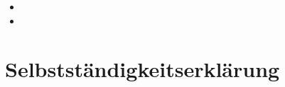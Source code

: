 \documentclass[ngerman, 12pt]{article} %
\begin{document}
\newpage


\listofattachments %

\newpage

\begin{attachment} %
    \lipsum[4] %
\end{attachment}

\begin{attachment} %
    \begin{customlistof}{0cm}{} %
        \begin{itemize}
            \item \lipsum[2] %
            \item \lipsum[2] %
        \end{itemize}
    \end{customlistof}
\end{attachment}

\thispagestyle{empty} %
\section*{Selbstständigkeitserklärung} %

\newpage
\listoftodos
\end{document}
